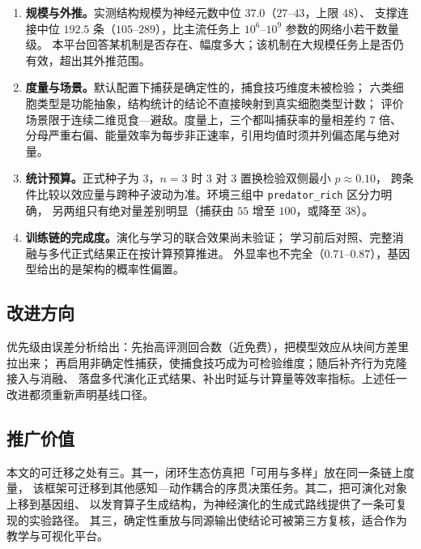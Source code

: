 \begin{enumerate}
  \item \textbf{规模与外推。}实测结构规模为神经元数中位 $37.0$（$27$--$43$，上限 $48$）、
        支撑连接中位 $192.5$ 条（$105$--$289$），比主流任务上 $10^{6}$--$10^{9}$ 参数的网络小若干数量级。
        本平台回答某机制是否存在、幅度多大；该机制在大规模任务上是否仍有效，超出其外推范围。
  \item \textbf{度量与场景。}默认配置下捕获是确定性的，捕食技巧维度未被检验；
        六类细胞类型是功能抽象，结构统计的结论不直接映射到真实细胞类型计数；
        评价场景限于连续二维觅食—避敌。度量上，三个都叫捕获率的量相差约 7 倍、
        分母严重右偏、能量效率为每步非正速率，引用均值时须并列偏态尾与绝对量。
  \item \textbf{统计预算。}正式种子为 3，$n=3$ 时 $3$ 对 $3$ 置换检验双侧最小 $p\approx0.10$，
        跨条件比较以效应量与跨种子波动为准。环境三组中 \texttt{predator\_rich} 区分力明确，
        另两组只有绝对量差别明显（捕获由 $55$ 增至 $100$，或降至 $38$）。
  \item \textbf{训练链的完成度。}演化与学习的联合效果尚未验证；
        学习前后对照、完整消融与多代正式结果正在按计算预算推进。
        外显率也不完全（$0.71$--$0.87$），基因型给出的是架构的概率性偏置。
\end{enumerate}

\subsection{改进方向}

优先级由误差分析给出：先抬高评测回合数（近免费），把模型效应从块间方差里拉出来；
再启用非确定性捕获，使捕食技巧成为可检验维度；随后补齐行为克隆接入与消融、
落盘多代演化正式结果、补出时延与计算量等效率指标。上述任一改进都须重新声明基线口径。

\subsection{推广价值}

本文的可迁移之处有三。其一，闭环生态仿真把「可用与多样」放在同一条链上度量，
该框架可迁移到其他感知—动作耦合的序贯决策任务。其二，把可演化对象上移到基因组、
以发育算子生成结构，为神经演化的生成式路线提供了一条可复现的实验路径。
其三，确定性重放与同源输出使结论可被第三方复核，适合作为教学与可视化平台。

